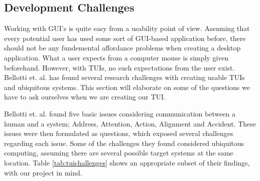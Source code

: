 \subsection{Development Challenges}
\label{sec:challenges-with-TUI}

Working with GUI's is quite easy from a usability point of view. Assuming that every potential user has used some sort of GUI-based application before, there should not be any fundemental affordance problems when creating a desktop application. What a user expects from a computer mouse is simply given beforehand. However, with TUIs, no such expectations from the user exist. Bellotti et. al.\cite{bellotti2002making} has found several research challenges with creating usable TUIs and ubiquitous systems. This section will elaborate on some of the questions we have to ask ourselves when we are creating our TUI.


Bellotti et. al. found five basic issues considering communication between a human and a system; Address, Attention, Action, Alignment and Accident.  
These issues were then formulated as questions, which exposed several challenges regarding each issue. 
Some of the challenges they found considered ubiquitous computing, assuming there are several possible target systems at the same location. Table \ref{tab:tuichallenges} shows an appropriate subset of their findings, with our project in mind.   

